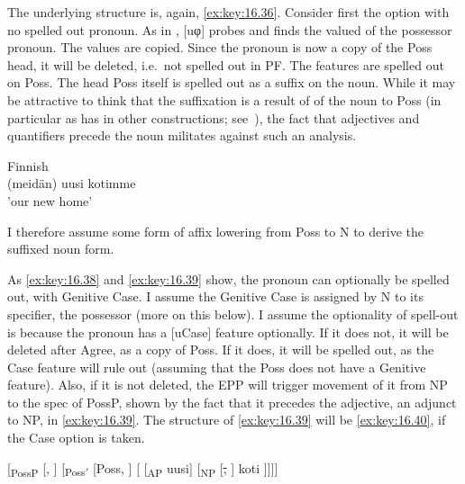 \documentclass[output=paper]{langsci/langscibook}
\begin{document}
The underlying structure is, again, \eqref{ex:key:16.36}. Consider first the option with no
spelled out pronoun. As in , [uφ] probes and finds the valued 
of the possessor pronoun. The values are copied. Since the pronoun is now a
copy of the Poss head, it will be deleted, i.e.\ not spelled out in PF. The
features are spelled out on Poss. The head Poss itself is spelled out as a
suffix on the noun. While it may be attractive to think that the suffixation is
a result of  of the noun to Poss (in particular as  has
 in other constructions; see~\citealt{HolmbergEtAl1993}), the fact that
adjectives and quantifiers precede the noun militates against such an analysis.

\ea Finnish\\\label{ex:key:16.39}
	(meidän) uusi kotimme\\
	'our new home'\\
\z

I therefore assume some form of affix lowering from Poss to N to derive the
suffixed noun form.

As \eqref{ex:key:16.38} and \eqref{ex:key:16.39} show, the pronoun can optionally be spelled out, with Genitive
Case. I assume the Genitive Case is assigned by N to its specifier, the
possessor (more on this below). I assume the optionality of spell-out is
because the pronoun has a [uCase] feature optionally. If it does not, it will
be deleted after Agree, as a copy of Poss. If it does, it will be spelled out,
as the Case feature will rule out  (assuming that the Poss does
not have a Genitive feature).  Also, if it is not deleted, the \gls{EPP} will trigger
movement of it from NP to the spec of PossP, shown by the fact that it precedes
the adjective, an adjunct to NP, in \eqref{ex:key:16.39}. The structure of \eqref{ex:key:16.39} will be \eqref{ex:key:16.40},
if the Case option is taken.

\ea\label{ex:key:16.40}
    {}[\textsubscript{PossP} [\Fpl{}, \Gen{}] [\textsubscript{Poss$'$}
        [Poss, \Fpl{}] [ [\textsubscript{AP} uusi]
        [\textsubscript{NP} [\sout{\Fpl{}, \Gen{}}] koti ]]]]
\z
\end{document}

